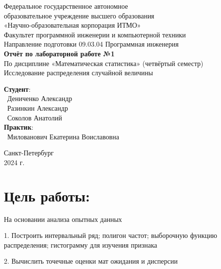 \documentclass{article}
\begin{document}
\begin{center}
    \Large
    Федеральное государственное автономное \\
    образовательное учреждение высшего образования \\ 
    «Научно-образовательная корпорация ИТМО»\\
    \vspace{0.5cm}
    \large
    Факультет программной инженерии и компьютерной техники \\
    Направление подготовки 09.03.04 Программная инженерия \\
    \vspace{1cm}
    \Large
    \textbf{Отчёт по лабораторной работе №1} \\
    По дисциплине «Математическая статистика» (четвёртый семестр)\\
    Исследование распределения случайной величины\\
    \large
    \vspace{8cm}

    \begin{minipage}{.33\textwidth}
    \end{minipage}
    \hfill
    \begin{minipage}{.4\textwidth}
    
        \textbf{Студент}: \vspace{.1cm} \\
        \ Дениченко Александр\\
        \ Разинкин Александр\\
        \ Соколов Анатолий\\
        \textbf{Практик}:  \\
        \ Милованович Екатерина Воиславовна
    \end{minipage}
    \vfill
Санкт-Петербург\\ 2024 г.
\end{center}

\newpage
\section*{Цель работы:}
\large

На основании анализа опытных данных

1. Построить интервальный ряд; полигон частот; выборочную функцию распределения; гистограмму для изучения признака

2. Вычислить точечные оценки мат ожидания и дисперсии
\end{document}

